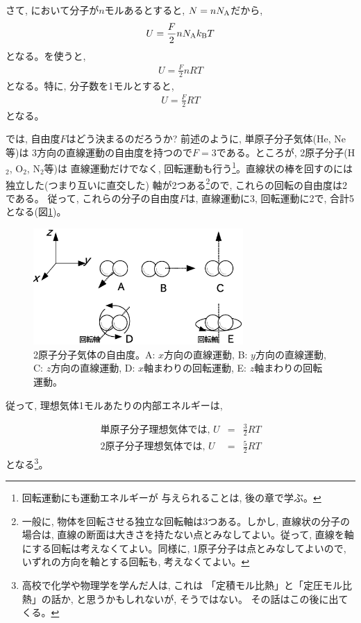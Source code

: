 さて, において分子が$n$モルあるとすると, $N=nN_{\text A}$だから, 
\begin{eqnarray}U=\frac{F}{2}nN_{\text A}k_{\text B}T\end{eqnarray}
となる。を使うと, 
\begin{eqnarray}U=\frac{F}{2}nRT\label{eq:gas_int_energy1}\end{eqnarray}
となる。特に, 分子数を1モルとすると, 
\begin{eqnarray}U=\frac{F}{2}RT\label{eq:gas_int_energy3}\end{eqnarray}
となる。

では, 自由度$F$はどう決まるのだろうか? 前述のように, 単原子分子気体(He, Ne等)は
3方向の直線運動の自由度を持つので$F=3$である。ところが, 2原子分子(H$_2$, O$_2$, N$_2$等)は
直線運動だけでなく, 回転運動も行う\footnote{回転運動にも運動エネルギーが
与えられることは, 後の章で学ぶ。}。直線状の棒を回すのには独立した(つまり互いに直交した)
軸が2つある\footnote{一般に, 物体を回転させる独立な回転軸は3つある。しかし, 
直線状の分子の場合は, 直線の断面は大きさを持たない点とみなしてよい。従って, 
直線を軸にする回転は考えなくてよい。同様に, 1原子分子は点とみなしてよいので, 
いずれの方向を軸とする回転も, 考えなくてよい。}ので, これらの回転の自由度は2である。
従って, これらの分子の自由度$F$は, 直線運動に3, 回転運動に2で, 合計5となる(図\ref{fig:deg_freedom2})。

\begin{figure}[h]
    \centering
    \includegraphics[width=8cm]{deg_freedom2.eps}
    \caption{2原子分子気体の自由度。A: $x$方向の直線運動, B: $y$方向の直線運動, C: $z$方向の直線運動, D: $x$軸まわりの回転運動, E: $z$軸まわりの回転運動。}\label{fig:deg_freedom2}
\end{figure}

従って, 理想気体1モルあたりの内部エネルギーは, 

\begin{eqnarray}
\text{単原子分子理想気体では, }U&=&\frac{3}{2}RT\label{eq:U_monomol}\\
\text{2原子分子理想気体では, }U&=&\frac{5}{2}RT\label{eq:U_2mol}
\end{eqnarray}
となる\footnote{高校で化学や物理学を学んだ人は, これは
「定積モル比熱」と「定圧モル比熱」の話か, と思うかもしれないが, そうではない。
その話はこの後に出てくる。}。

